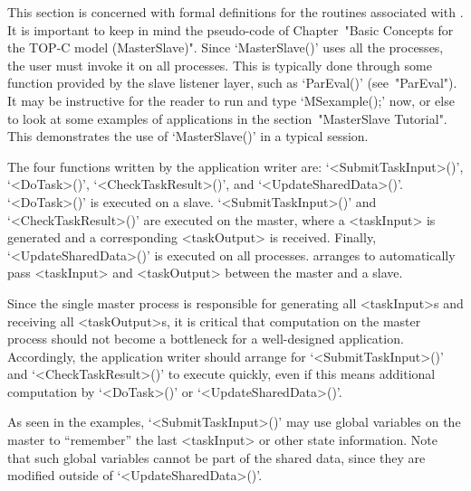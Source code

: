
This section is  concerned  with  formal  definitions  for  the  routines
associated  with  {\ParGAP}.  It  is  important  to  keep  in  mind   the
pseudo-code   of   Chapter~"Basic   Concepts   for   the   TOP-C    model
(MasterSlave)". Since `MasterSlave()' uses all the  {\ParGAP}  processes,
the user must invoke it on all processes. This is typically done  through
some function provided by the slave listener layer, such  as  `ParEval()'
(see~"ParEval"). It may be instructive for the reader  to  run  {\ParGAP}
and type `MSexample();'  now,  or  else  to  look  at  some  examples  of
{\ParGAP}  applications  in  the  section~"MasterSlave  Tutorial".   This
demonstrates the use of `MasterSlave()' in a typical session.

The   four   functions   written   by   the   application   writer   are:
`<SubmitTaskInput>()',    `<DoTask>()',    `<CheckTaskResult>()',     and
`<UpdateSharedData>()'.   `<DoTask>()'   is   executed   on   a    slave.
`<SubmitTaskInput>()'  and  `<CheckTaskResult>()'  are  executed  on  the
master, where a <taskInput> is generated and a corresponding <taskOutput>
is  received.  Finally,  `<UpdateSharedData>()'  is   executed   on   all
processes. {\ParGAP}  arranges  to  automatically  pass  <taskInput>  and
<taskOutput> between the master and a slave.

Since the  single  master  process  is  responsible  for  generating  all
<taskInput>s  and  receiving  all  <taskOutput>s,  it  is  critical  that
computation on the master process should not become a  bottleneck  for  a
well-designed {\ParGAP} application. Accordingly, the application  writer
should arrange for  `<SubmitTaskInput>()'  and  `<CheckTaskResult>()'  to
execute  quickly,  even  if  this   means   additional   computation   by
`<DoTask>()' or `<UpdateSharedData>()'.

As seen in the examples, `<SubmitTaskInput>()' may use global  variables  on
the  master  to  ``remember''  the  last  <taskInput>  or   other   state
information. Note that such  global  variables  cannot  be  part  of  the
shared data, since they are modified outside of `<UpdateSharedData>()'.


